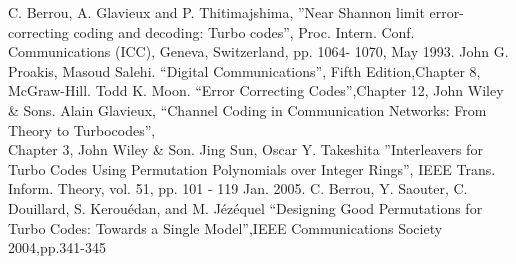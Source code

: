 \begin{thebibliography}{99}
  C. Berrou, A. Glavieux and P. Thitimajshima, 
''Near Shannon limit error-correcting coding and
decoding: Turbo codes'', Proc. Intern. Conf. Communications (ICC), Geneva, 
Switzerland, pp. 1064-
1070, May 1993.
 John G. Proakis, Masoud Salehi. ``Digital Communications'', 
Fifth Edition,Chapter 8, McGraw-Hill.
 Todd K. Moon. ``Error Correcting Codes'',Chapter 12, John Wiley \& Sons.
Alain Glavieux, ``Channel Coding in Communication Networks: From Theory to Turbocodes'',\\ Chapter 3, John Wiley \& Son. 
 Jing Sun, Oscar Y. Takeshita ''Interleavers for Turbo Codes Using 
Permutation Polynomials over Integer Rings'', IEEE Trans. Inform. Theory, vol. 51, 
pp. 101 - 119  Jan. 2005.
 C. Berrou, Y. Saouter, C. Douillard, S. Kerouédan, and M. Jézéquel ``Designing Good Permutations for Turbo Codes: Towards a Single Model'',IEEE Communications Society 2004,pp.341-345

\end{thebibliography}